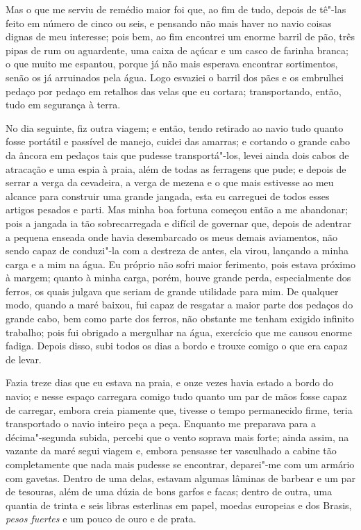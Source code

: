 Mas o que me serviu de remédio maior foi que, ao fim de tudo, depois de
tê"-las feito em número de cinco ou seis, e pensando não mais haver no
navio coisas dignas de meu interesse; pois bem, ao fim encontrei um
enorme barril de pão, três pipas de rum ou aguardente, uma caixa de
açúcar e um casco de farinha branca; o que muito me espantou, porque já
não mais esperava encontrar sortimentos, senão os já arruinados pela
água. Logo esvaziei o barril dos pães e os embrulhei pedaço por pedaço
em retalhos das velas que eu cortara; transportando, então, tudo em
segurança à terra.

No dia seguinte, fiz outra viagem; e então, tendo retirado ao navio tudo
quanto fosse portátil e passível de manejo, cuidei das amarras; e
cortando o grande cabo da âncora em pedaços tais que pudesse
transportá"-los, levei ainda dois cabos de atracação e uma espia à praia,
além de todas as ferragens que pude; e depois de serrar a verga da
cevadeira, a verga de mezena e o que mais estivesse ao meu alcance para
construir uma grande jangada, esta eu carreguei de todos esses artigos
pesados e parti. Mas minha boa fortuna começou então a me abandonar;
pois a jangada ia tão sobrecarregada e difícil de governar que, depois
de adentrar a pequena enseada onde havia desembarcado os meus demais
aviamentos, não sendo capaz de conduzi"-la com a destreza de antes, ela
virou, lançando a minha carga e a mim na água. Eu próprio não sofri
maior ferimento, pois estava próximo à margem; quanto à minha carga,
porém, houve grande perda, especialmente dos ferros, os quais julgava
que seriam de grande utilidade para mim. De qualquer modo, quando a maré
baixou, fui capaz de resgatar a maior parte dos pedaços do grande cabo,
bem como parte dos ferros, não obstante me tenham exigido infinito
trabalho; pois fui obrigado a mergulhar na água, exercício que me causou
enorme fadiga. Depois disso, subi todos os dias a bordo e trouxe comigo
o que era capaz de levar.

Fazia treze dias que eu estava na praia, e onze vezes havia estado a
bordo do navio; e nesse espaço carregara comigo tudo quanto um par de
mãos fosse capaz de carregar, embora creia piamente que, tivesse o tempo
permanecido firme, teria transportado o navio inteiro peça a peça.
Enquanto me preparava para a décima"-segunda subida, percebi que o vento
soprava mais forte; ainda assim, na vazante da maré segui viagem e,
embora pensasse ter vasculhado a cabine tão completamente que nada mais
pudesse se encontrar, deparei"-me com um armário com gavetas. Dentro de
uma delas, estavam algumas lâminas de barbear e um par de tesouras, além
de uma dúzia de bons garfos e facas; dentro de outra, uma quantia de
trinta e seis libras esterlinas em papel, moedas europeias e dos Brasis,
\emph{pesos fuertes} e um pouco de ouro e de prata.

